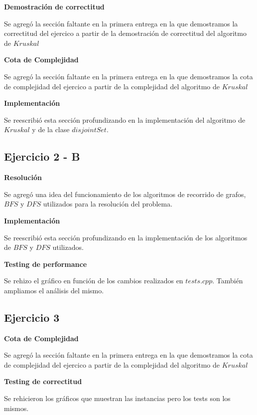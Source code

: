 \documentclass[10pt,a4paper]{article}
\begin{document}
\textbf{Demostración de correctitud}
\par{Se agregó la sección faltante en la primera entrega en la que demostramos
la correctitud del ejercico a partir de la demostración de correctitud del
algoritmo de $Kruskal$}

\textbf{Cota de Complejidad}
\par{Se agregó la sección faltante en la primera entrega en la que demostramos
la cota de complejidad del ejercico a partir de la complejidad del
algoritmo de $Kruskal$}

\textbf{Implementación}
\par{Se reescribió esta sección profundizando en la implementación del
algoritmo de $Kruskal$ y de la clase $disjointSet$.}

\subsection{Ejercicio 2 - B}
\textbf{Resolución}
\par{Se agregó una idea del funcionamiento de los algoritmos de recorrido de
grafos, $BFS$ y $DFS$ utilizados para la resolución del problema.}

\textbf{Implementación}
\par{Se reescribió esta sección profundizando en la implementación de los
algoritmos de $BFS$ y $DFS$ utilizados.}

\textbf{Testing de performance}
\par{Se rehizo el gráfico en función de los cambios realizados en $tests.cpp$.
También ampliamos el análisis del mismo.}
\subsection{Ejercicio 3}
\textbf{Cota de Complejidad}
\par{Se agregó la sección faltante en la primera entrega en la que demostramos
la cota de complejidad del ejercico a partir de la complejidad del
algoritmo de $Kruskal$}

\textbf{Testing de correctitud}
\par{Se rehicieron los gráficos que muestran las instancias pero los tests
son los mismos.}
\end{document}

